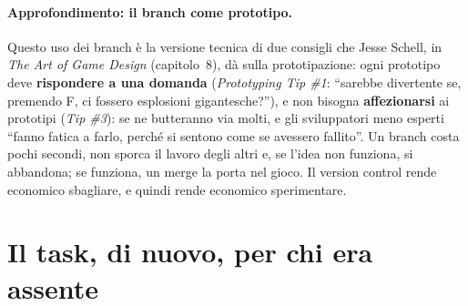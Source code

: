 \paragraph{Approfondimento: il branch come prototipo.} Questo uso dei branch è
la versione tecnica di due consigli che Jesse Schell, in \emph{The Art of Game
Design} (capitolo~8), dà sulla prototipazione: ogni prototipo deve
\textbf{rispondere a una domanda} (\emph{Prototyping Tip \#1}: ``sarebbe
divertente se, premendo F, ci fossero esplosioni gigantesche?''), e non bisogna
\textbf{affezionarsi} ai prototipi (\emph{Tip \#3}): se ne butteranno via molti,
e gli sviluppatori meno esperti ``fanno fatica a farlo, perché si sentono come
se avessero fallito''. Un branch costa pochi secondi, non sporca il lavoro degli
altri e, se l'idea non funziona, si abbandona; se funziona, un merge la porta nel
gioco. Il version control rende economico sbagliare, e quindi rende economico
sperimentare.

\section{Il task, di nuovo, per chi era assente}
\label{gd13:sec:task}

